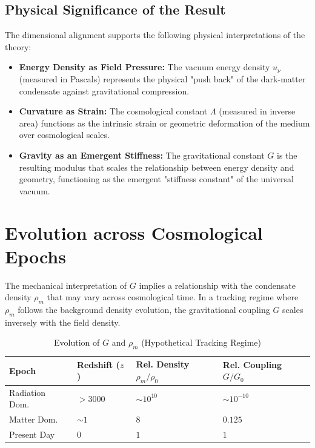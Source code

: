 \documentclass[11pt,a4paper]{article}
\begin{document}
\subsection*{Physical Significance of the Result}
The dimensional alignment supports the following physical interpretations of the theory:
\begin{itemize}
    \item \textbf{Energy Density as Field Pressure:} The vacuum energy density $u_\nu$ (measured in Pascals) represents the physical "push back" of the dark-matter condensate against gravitational compression.
    \item \textbf{Curvature as Strain:} The cosmological constant $\Lambda$ (measured in inverse area) functions as the intrinsic strain or geometric deformation of the medium over cosmological scales.
    \item \textbf{Gravity as an Emergent Stiffness:} The gravitational constant $G$ is the resulting modulus that scales the relationship between energy density and geometry, functioning as the emergent "stiffness constant" of the universal vacuum.
\end{itemize}


\section{Evolution across Cosmological Epochs}
The mechanical interpretation of $G$ implies a relationship with the condensate density $\rho_m$ that may vary across cosmological time. In a tracking regime where $\rho_m$ follows the background density evolution, the gravitational coupling $G$ scales inversely with the field density.

\begin{table}[h]
\centering
\caption{Evolution of $G$ and $\rho_m$ (Hypothetical Tracking Regime)}
\label{tab:epochs}
\vspace{2mm}
\begin{tabular}{@{}llll@{}}
\toprule
\textbf{Epoch} & \textbf{Redshift ($z$)} & \textbf{Rel. Density $\rho_m / \rho_0$} & \textbf{Rel. Coupling $G/G_0$} \\ \midrule
Radiation Dom. & $> 3000$ & $\sim 10^{10}$ & $\sim 10^{-10}$ \\
Matter Dom. & $\sim 1$ & $8$ & $0.125$ \\
Present Day & $0$ & $1$ & $1$ \\ \bottomrule
\end{tabular}
\end{table}
\end{document}
